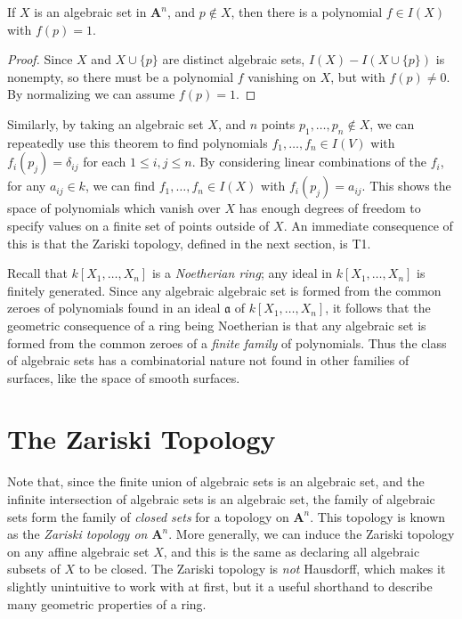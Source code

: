 \begin{theorem}
    If $X$ is an algebraic set in $\mathbf{A}^n$, and $p \not \in X$, then there is a polynomial $f \in I(X)$ with $f(p) = 1$.
\end{theorem}
\begin{proof}
    Since $X$ and $X \cup \{ p \}$ are distinct algebraic sets, $I(X) - I(X \cup \{ p \})$ is nonempty, so there must be a polynomial $f$ vanishing on $X$, but with $f(p) \neq 0$. By normalizing we can assume $f(p) = 1$.
\end{proof}

Similarly, by taking an algebraic set $X$, and $n$ points $p_1, \dots, p_n \not \in X$, we can repeatedly use this theorem to find polynomials $f_1, \dots, f_n \in I(V)$ with $f_i(p_j) = \delta_{ij}$ for each $1 \leq i,j \leq n$. By considering linear combinations of the $f_i$, for any $a_{ij} \in k$, we can find $f_1, \dots, f_n \in I(X)$ with $f_i(p_j) = a_{ij}$. This shows the space of polynomials which vanish over $X$ has enough degrees of freedom to specify values on a finite set of points outside of $X$. An immediate consequence of this is that the Zariski topology, defined in the next section, is T1.

Recall that $k[X_1,\dots,X_n]$ is a \emph{Noetherian ring}; any ideal in $k[X_1,\dots,X_n]$ is finitely generated. Since any algebraic algebraic set is formed from the common zeroes of polynomials found in an ideal $\mathfrak{a}$ of $k[X_1,\dots,X_n]$, it follows that the geometric consequence of a ring being Noetherian is that any algebraic set is formed from the common zeroes of a \emph{finite family} of polynomials. Thus the class of algebraic sets has a combinatorial nature not found in other families of surfaces, like the space of smooth surfaces.

\section{The Zariski Topology}

Note that, since the finite union of algebraic sets is an algebraic set, and the infinite intersection of algebraic sets is an algebraic set, the family of algebraic sets form the family of \emph{closed sets} for a topology on $\mathbf{A}^n$. This topology is known as the \emph{Zariski topology on $\mathbf{A}^n$}. More generally, we can induce the Zariski topology on any affine algebraic set $X$, and this is the same as declaring all algebraic subsets of $X$ to be closed. The Zariski topology is \emph{not} Hausdorff, which makes it slightly unintuitive to work with at first, but it a useful shorthand to describe many geometric properties of a ring.

